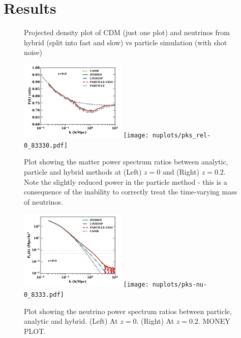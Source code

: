 \documentclass[useAMS, usenatbib]{mnras}
\begin{document}

%


\section{Results}
\label{sec:results}

\begin{figure}
  \caption{Projected density plot of CDM (just one plot) and neutrinos from hybrid (split into fast and slow) vs particle simulation (with shot noise)}
  \label{fig:density_plot}
\end{figure}

\begin{figure}
\includegraphics[width=0.45\textwidth]{nuplots/pks_rel-10.pdf}
\texttt{[image: nuplots/pks\_rel-0\_83330.pdf]}
  \caption{Plot showing the matter power spectrum ratios between analytic, particle and hybrid methods at (Left) $z=0$ and (Right) $z=0.2$. Note the slightly reduced power in the particle method - this is a consequence of the inability to correctly treat the time-varying mass of neutrinos.
  }
  \label{fig:matter_power}
\end{figure}

\begin{figure}
\includegraphics[width=0.45\textwidth]{nuplots/pks-nu-1.pdf}
\texttt{[image: nuplots/pks-nu-0\_8333.pdf]}
  \caption{Plot showing the neutrino power spectrum ratios between particle, analytic and hybrid.
  (Left) At $z=0$. (Right) At $z=0.2$.
  MONEY PLOT.}
  \label{fig:neutrino_power}
\end{figure}
\end{document}
